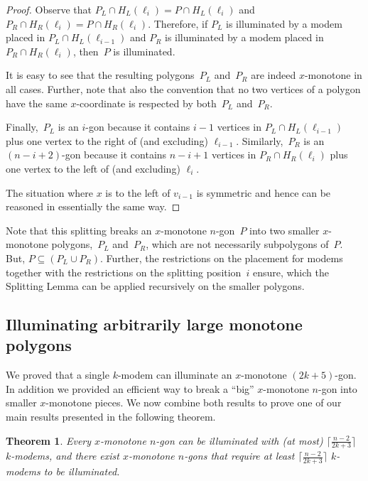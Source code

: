 \documentclass[A4]{article}
\newtheorem{theorem}{Theorem}
\begin{document}
\begin{proof}
Observe that $P_L\cap H_L(\ell_i)=P\cap H_L(\ell_i)$ and $P_R\cap H_R(\ell_i)=P\cap H_R(\ell_i)$.
Therefore, if $P_L$ is illuminated by a modem placed in $P_L\cap H_L(\ell_{i-1})$ and $P_R$ is illuminated by a modem placed in $P_R\cap H_R(\ell_{i})$, then~$P$ is illuminated.








It is easy to see that the resulting polygons~$P_L$ and~$P_R$ are indeed $x$-monotone in all cases.
Further, note that also the convention that no two vertices of a polygon have the same $x$-coordinate is respected by both~$P_L$ and~$P_R$.

Finally,~$P_L$ is an $i$-gon because it contains $i-1$ vertices in $P_L\cap H_L(\ell_{i-1})$ plus one vertex to the right of (and excluding) $\ell_{i-1}$.
Similarly,~$P_R$ is an $(n-i+2)$-gon because it contains $n-i+1$ vertices in $P_R\cap H_R(\ell_{i})$ plus one vertex to the left of (and excluding) $\ell_{i}$.

The situation where $x$ is to the left of $v_{i-1}$ is symmetric and hence can be reasoned in essentially the same way.
\end{proof}

 
Note that this splitting breaks an $x$-monotone $n$-gon~$P$ into two smaller $x$-monotone polygons,~$P_L$ and~$P_R$, which are not necessarily subpolygons of~$P$.
But, $P\subseteq ( P_L\cup P_R )$.
Further, the restrictions on the placement for modems together with the restrictions on the splitting position~$i$ ensure, which the Splitting Lemma can be applied recursively on the smaller polygons.


\subsection{Illuminating arbitrarily large monotone polygons}
\label{sec:gmono-main}


We proved that a single \mbox{$k$-modem} can illuminate an $x$-monotone $(2k+5)$-gon.
In addition we provided an efficient way to break a ``big'' $x$-monotone $n$-gon into smaller $x$-monotone pieces.
We now combine both results to prove one of our main results presented in the following theorem.


\begin{theorem}\label{thm:gmono-generalbound}
Every $x$-monotone $n$-gon can be illuminated with (at most) $\lceil \frac{n-2}{2k+3}\rceil$~\mbox{$k$-modems}, and there exist $x$-monotone $n$-gons that require at least $\lceil \frac{n-2}{2k+3}\rceil$ \mbox{$k$-modems} to be illuminated.
\end{theorem}
\end{document}
